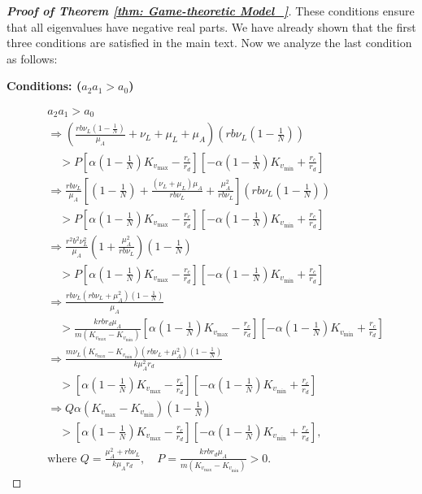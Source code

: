 \documentclass{article}
\theoremstyle{remark}
\theoremstyle{custom} %
\begin{document}
\begin{proof}[\textbf{Proof of Theorem \ref{thm: Game-theoretic Model_}}]
These conditions ensure that all eigenvalues have negative real parts. We have already shown that the first three conditions are satisfied in the main text. Now we analyze the last condition as follows:

\textbf{Conditions: ($a_2 a_1 > a_0$)}

$$\begin{aligned}
& a_2 a_1 > a_0 \\[0.3cm]
& \Rightarrow \left(\frac{r b \nu_L\left(1-\frac{1}{N}\right)}{\mu_A} + \nu_L + \mu_L + \mu_A\right)\left(r b \nu_L\left(1-\frac{1}{N}\right)\right) \\
& \quad > P \left[\alpha\left(1-\frac{1}{N}\right) K_{v_{\max }} - \frac{r_c}{r_d}\right]\left[-\alpha\left(1-\frac{1}{N}\right) K_{v_{\min }} + \frac{r_c}{r_d}\right] \\[0.3cm]
& \Rightarrow \frac{r b \nu_L}{\mu_A} \left[\left(1-\frac{1}{N}\right) + \frac{(\nu_L + \mu_L) \mu_A}{r b \nu_L} + \frac{\mu_A^2}{r b \nu_L}\right]\left(r b \nu_L\left(1-\frac{1}{N}\right)\right) \\
& \quad > P \left[\alpha\left(1-\frac{1}{N}\right) K_{v_{\max }} - \frac{r_c}{r_d}\right]\left[-\alpha\left(1-\frac{1}{N}\right) K_{v_{\min }} + \frac{r_c}{r_d}\right] \\[0.3cm]
& \Rightarrow \frac{r^2 b^2 \nu_L^2}{\mu_A} \left(1 + \frac{\mu_A^2}{r b \nu_L}\right)\left(1-\frac{1}{N}\right) \\
& \quad > P \left[\alpha\left(1-\frac{1}{N}\right) K_{v_{\max }} - \frac{r_c}{r_d}\right]\left[-\alpha\left(1-\frac{1}{N}\right) K_{v_{\min }} + \frac{r_c}{r_d}\right] \\[0.3cm]
& \Rightarrow \frac{r b \nu_L\left(r b \nu_L + \mu_A^2\right)\left(1-\frac{1}{N}\right)}{\mu_A} \\
& \quad > \frac{k r b r_d  \mu_A}{m \left(K_{v_{\max }} - K_{v_{\min }}\right)}\left[\alpha\left(1-\frac{1}{N}\right) K_{v_{\max }} - \frac{r_c}{r_d}\right]\left[-\alpha\left(1-\frac{1}{N}\right) K_{v_{\min }} + \frac{r_c}{r_d}\right] \\[0.3cm]
& \Rightarrow \frac{m \nu_L \left(K_{v_{\max }} - K_{v_{\min }}\right)\left(r b \nu_L + \mu_A^2\right)\left(1-\frac{1}{N}\right)}{k \mu_A^2 r_d} \\
& \quad > \left[\alpha\left(1-\frac{1}{N}\right) K_{v_{\max }} - \frac{r_c}{r_d}\right]\left[-\alpha\left(1-\frac{1}{N}\right) K_{v_{\min }} + \frac{r_c}{r_d}\right] \\[0.3cm]
& \Rightarrow Q \alpha \left(K_{v_{\max }} - K_{v_{\min }}\right)\left(1-\frac{1}{N}\right) \\
& \quad > \left[\alpha\left(1-\frac{1}{N}\right) K_{v_{\max }} - \frac{r_c}{r_d}\right]\left[-\alpha\left(1-\frac{1}{N}\right) K_{v_{\min }} + \frac{r_c}{r_d}\right], \\[0.3cm]
& \text{where }Q=\frac{\mu_A^2+r b \nu_L}{k \mu_A r_d}, \quad P = \frac{k r b r_d \mu_A}{m \left(K_{v_{\max }} - K_{v_{\min }}\right)} > 0.
\end{aligned}
$$



\end{proof}
\end{document}
